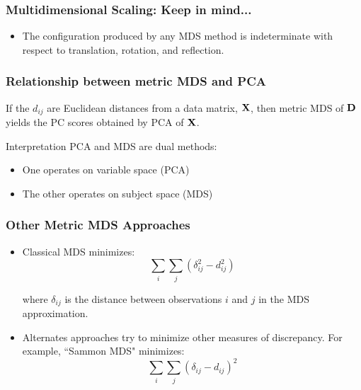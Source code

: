 \documentclass{beamer}
\begin{document}
\begin{frame}
  \frametitle{Multidimensional Scaling: Keep in mind...}

\begin{itemize}
\item The configuration produced by any MDS method is indeterminate with respect to translation, rotation, and reflection.

\end{itemize}


\end{frame}

\begin{frame}
  \frametitle{Relationship between metric MDS and PCA}

 If the $d_{ij}$ are Euclidean distances from a data matrix, $\mathbf{X}$, then metric MDS of $\mathbf{D}$ yields the PC scores obtained by PCA of $\mathbf{X}$.

 \medskip
  \begin{block}{Interpretation}
PCA and MDS are dual methods:
\begin{itemize}
  \item One operates on variable space (PCA)
  \item The other operates on subject space (MDS)
\end{itemize}
\end{block}

\end{frame}

\begin{frame}
  \frametitle{Other Metric MDS Approaches}

\begin{itemize}
\item Classical MDS minimizes:
\[
\sum_i \sum_j(\delta_{ij}^2 - d_{ij}^2)
\]

where $\delta_{ij}$ is the distance between observations $i$ and $j$ in the MDS approximation.

\item Alternates approaches try to minimize other measures of discrepancy. For example, ``Sammon MDS" minimizes:
\[
\sum_i \sum_j (\delta_{ij} - d_{ij})^2
\]
\end{itemize}
\end{frame}
\end{document}
